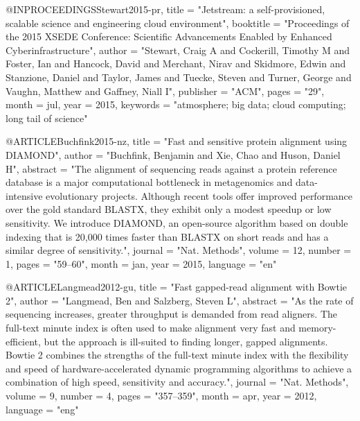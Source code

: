 @INPROCEEDINGS{Stewart2015-pr,
  title     = "Jetstream: a self-provisioned, scalable science and engineering
               cloud environment",
  booktitle = "Proceedings of the 2015 {XSEDE} Conference: Scientific
               Advancements Enabled by Enhanced Cyberinfrastructure",
  author    = "Stewart, Craig A and Cockerill, Timothy M and Foster, Ian and
               Hancock, David and Merchant, Nirav and Skidmore, Edwin and
               Stanzione, Daniel and Taylor, James and Tuecke, Steven and
               Turner, George and Vaughn, Matthew and Gaffney, Niall I",
  publisher = "ACM",
  pages     = "29",
  month     =  jul,
  year      =  2015,
  keywords  = "atmosphere; big data; cloud computing; long tail of science"
}

@ARTICLE{Buchfink2015-nz,
  title    = "Fast and sensitive protein alignment using {DIAMOND}",
  author   = "Buchfink, Benjamin and Xie, Chao and Huson, Daniel H",
  abstract = "The alignment of sequencing reads against a protein reference
              database is a major computational bottleneck in metagenomics and
              data-intensive evolutionary projects. Although recent tools offer
              improved performance over the gold standard BLASTX, they exhibit
              only a modest speedup or low sensitivity. We introduce DIAMOND,
              an open-source algorithm based on double indexing that is 20,000
              times faster than BLASTX on short reads and has a similar degree
              of sensitivity.",
  journal  = "Nat. Methods",
  volume   =  12,
  number   =  1,
  pages    = "59--60",
  month    =  jan,
  year     =  2015,
  language = "en"
}

@ARTICLE{Langmead2012-gu,
  title    = "Fast gapped-read alignment with Bowtie 2",
  author   = "Langmead, Ben and Salzberg, Steven L",
  abstract = "As the rate of sequencing increases, greater throughput is
              demanded from read aligners. The full-text minute index is often
              used to make alignment very fast and memory-efficient, but the
              approach is ill-suited to finding longer, gapped alignments.
              Bowtie 2 combines the strengths of the full-text minute index
              with the flexibility and speed of hardware-accelerated dynamic
              programming algorithms to achieve a combination of high speed,
              sensitivity and accuracy.",
  journal  = "Nat. Methods",
  volume   =  9,
  number   =  4,
  pages    = "357--359",
  month    =  apr,
  year     =  2012,
  language = "eng"
}



